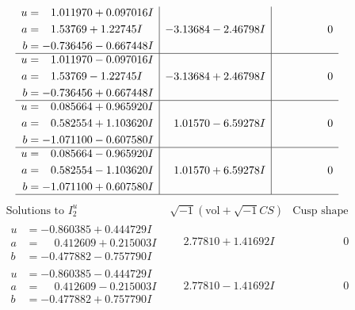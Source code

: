 \documentclass[1p]{elsarticle_modified}
\theoremstyle{definition}
\newcommand{\I}{\sqrt{-1}}
\begin{document}
$$\begin{array}{c|c|c}
\begin{aligned}
u &= \phantom{-}1.011970 + 0.097016 I \\
a &= \phantom{-}1.53769 + 1.22745 I \\
b &= -0.736456 - 0.667448 I\end{aligned}
 & -3.13684 - 2.46798 I & \phantom{-0.000000 } 0 \\ \hline\begin{aligned}
u &= \phantom{-}1.011970 - 0.097016 I \\
a &= \phantom{-}1.53769 - 1.22745 I \\
b &= -0.736456 + 0.667448 I\end{aligned}
 & -3.13684 + 2.46798 I & \phantom{-0.000000 } 0 \\ \hline\begin{aligned}
u &= \phantom{-}0.085664 + 0.965920 I \\
a &= \phantom{-}0.582554 + 1.103620 I \\
b &= -1.071100 - 0.607580 I\end{aligned}
 & \phantom{-}1.01570 - 6.59278 I & \phantom{-0.000000 } 0 \\ \hline\begin{aligned}
u &= \phantom{-}0.085664 - 0.965920 I \\
a &= \phantom{-}0.582554 - 1.103620 I \\
b &= -1.071100 + 0.607580 I\end{aligned}
 & \phantom{-}1.01570 + 6.59278 I & \phantom{-0.000000 } 0\\
 \hline 
 \end{array}$$\newpage$$\begin{array}{c|c|c}  
\text{Solutions to }I^u_{2}& \I (\text{vol} + \sqrt{-1}CS) & \text{Cusp shape}\\
 \hline 
\begin{aligned}
u &= -0.860385 + 0.444729 I \\
a &= \phantom{-}0.412609 + 0.215003 I \\
b &= -0.477882 - 0.757790 I\end{aligned}
 & \phantom{-}2.77810 + 1.41692 I & \phantom{-0.000000 } 0 \\ \hline\begin{aligned}
u &= -0.860385 - 0.444729 I \\
a &= \phantom{-}0.412609 - 0.215003 I \\
b &= -0.477882 + 0.757790 I\end{aligned}
 & \phantom{-}2.77810 - 1.41692 I & \phantom{-0.000000 } 0 \\ \hline\begin{aligned}

\end{aligned}
\end{array}$$
\end{document}
